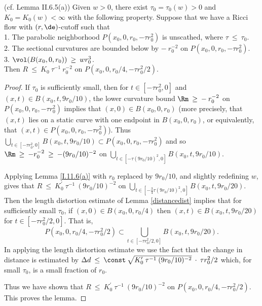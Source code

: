 \begin{lemma}
  \label{lem:kl-earlier-scalar-curvature-bounds-smaller-balls-from-lower-curvature-bound-estimates-scalar-curvature-4}
 \label{II.6.5(a)}
(cf. Lemma II.6.5(a))
Given $w > 0$, there exist $\tau_0 = \tau_0(w) > 0$ and $K_0 =
K_0(w) < \infty$ with the following property. Suppose that we have
a Ricci flow with $(r,\de)$-cutoff such that \\
1. The parabolic neighborhood
$P(x_0, 0, r_0, -\tau r_0^2)$ is unscathed,
where $\tau \: \le \: \tau_0$. \\
2. The sectional curvatures are bounded below by $- \: r_0^{-2}$ on
$P(x_0, 0, r_0, -\tau r_0^2)$. \\
3. $\vol(B(x_0, 0, r_0)) \: \ge \: wr_0^3$. \\

Then $R \: \le \: K_0 \: \tau^{-1} \: r_0^{-2}$ on
$P(x_0, 0, r_0/4, -\tau r_0^2/2)$.
\end{lemma}
\begin{proof}
If $\tau_0$ is sufficiently small, then for
$t \in [- \tau r_0^2, 0]$ and
$(x,t) \in B(x_0, t, 9r_0/10)$, the lower
curvature bound
$\Rm \: \ge \: - \: r_0^{-2}$ on $P(x_0, 0, r_0, -
\tau r_0^2)$ implies that $(x,0) \in B(x_0, 0, r_0)$ (more precisely,
that $(x,t)$ lies on a static curve with one endpoint in $B(x_0,0,r_0)$,
or equivalently, that $(x,t)\in P(x_0,0,r_0,-\tau r_0^2)$).
Thus $\bigcup_{ t \in
[-\tau r_0^2, 0]} B(x_0, t, 9r_0/10)
\subset P(x_0, 0, r_0, - \tau r_0^2)$ and so
$\Rm \: \ge \:-r_0^{-2}\:\ge\: - (9r_0/10)^{-2}$
 on
$\bigcup_{t \in
[-\tau (9r_0/10)^2, 0]} B(x_0, t, 9r_0/10)$.

Applying
Lemma
\ref{I.11.6(a)} with $r_0$ replaced by
$9r_0/10$, and slightly redefining $w$, gives that
$R \: \le \: K_0^\prime \: \tau^{-1} \: (9r_0/10)^{-2}$
on $\bigcup_{t \in [- \frac34 \tau (9r_0/10)^2, 0]} B(x_0, t, 9r_0/20)$.
Then the length distortion estimate of Lemma \ref{distancedist} implies that for
sufficiently small $\tau_0$, if
$(x,0) \in B(x_0, 0, r_0/4)$
then
$(x,t) \in B(x_0, t, 9r_0/20)$
for
$t \in [-\tau r_0^2/2, 0]$. That is,
\begin{equation}
P(x_0, 0, r_0/4, -\tau r_0^2/2) \subset
\bigcup_{t \in [- \tau r_0^2/2, 0]} B(x_0, t, 9r_0/20).
\end{equation}
In applying the length distortion estimate we use the fact that
the change in distance is estimated by
$\Delta d \: \le \:
\const \: \sqrt{K_0^\prime \: \tau^{-1} \: (9r_0/10)^{-2}} \: \cdot \:
\tau r_0^2/2$
which, for small $\tau_0$, is a small fraction
of $r_0$.

Thus we have shown that
$R \: \le \: K_0^\prime \: \tau^{-1} \: (9r_0/10)^{-2}$
on $P(x_0, 0, r_0/4, -\tau r_0^2/2)$.
This proves the lemma.
\end{proof}

